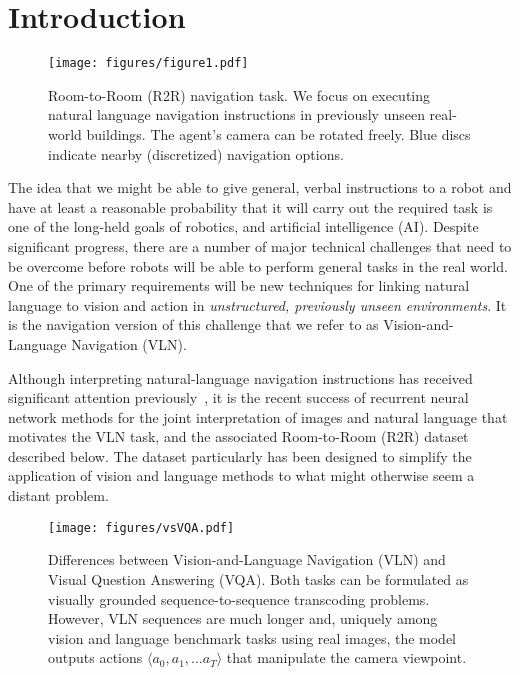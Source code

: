 \documentclass[10pt,twocolumn,letterpaper]{article}
\begin{document}
\section{Introduction}

\begin{figure}[htb]
	\begin{center}
		\texttt{[image: figures/figure1.pdf]}
	\end{center}
	\caption{	
		Room-to-Room (R2R) navigation task. We focus on executing natural language navigation instructions in previously unseen real-world buildings. The agent's camera can be rotated freely. Blue discs indicate nearby (discretized) navigation options.}
	\label{fig:concept}
\end{figure}

The idea that we might be able to give general, verbal instructions to a robot and have at least a reasonable probability that it will carry out the required task is one of the long-held goals of robotics, and artificial intelligence (AI). Despite significant progress, there are a number of major technical challenges that need to be overcome before robots will be able to perform general tasks in the real world. One of the primary requirements will be new techniques for linking natural language to vision and action in \textit{unstructured, previously unseen environments}. It is the navigation version of this challenge that we refer to as Vision-and-Language Navigation (VLN).  

Although interpreting natural-language navigation instructions has received significant attention previously~\cite{chaplot2017gated,chen2011learning,guadarrama2013grounding,mei2016listen,misra2017mapping,tellex2011understanding}, it is the recent success of recurrent neural network methods for the joint interpretation of images and natural language that motivates the VLN task, and the associated Room-to-Room (R2R) dataset described below.  The dataset particularly has been designed to simplify the application of vision and language methods to what might otherwise seem a distant problem.

\begin{figure*}[t]
	\begin{center}
		\texttt{[image: figures/vsVQA.pdf]}
	\end{center}
	\caption{Differences between Vision-and-Language Navigation (VLN)  and Visual Question Answering (VQA). Both tasks can be formulated as visually grounded sequence-to-sequence transcoding problems. However, VLN sequences are much longer and, uniquely among vision and language benchmark tasks using real images, the model outputs actions $\langle a_0, a_1, \dots a_T \rangle$ that manipulate the camera viewpoint.}
	\label{fig:vqa}
\end{figure*}
\end{document}
